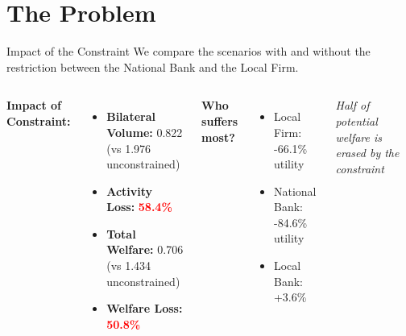 \documentclass[aspectratio=169]{beamer}
\begin{document}
\section{The Problem}


\begin{frame}{Impact of the Constraint}
    We compare the scenarios with and without the restriction between the National Bank and the Local Firm.
    
    \vspace{0.3cm}
    \begin{columns}
        \textbf{Impact of Constraint:}
        \begin{itemize}
            \item \textbf{Bilateral Volume:} 0.822 (vs 1.976 unconstrained)
            \item \textbf{Activity Loss:} \textcolor{red}{\textbf{58.4\%}}
            \item \textbf{Total Welfare:} 0.706 (vs 1.434 unconstrained)
            \item \textbf{Welfare Loss:} \textcolor{red}{\textbf{50.8\%}}
        \end{itemize}
        
        \vspace{0.3cm}
        \textbf{Who suffers most?}
        \begin{itemize}
            \item Local Firm: -66.1\% utility
            \item National Bank: -84.6\% utility
            \item Local Bank: \textcolor{SafeGreen}{+3.6\%} 
        \end{itemize}
        
        \centering
        
        \vspace{0.3cm}
        \small{\textit{Half of potential welfare is erased by the constraint}}
    \end{columns}
\end{frame}
\end{document}
